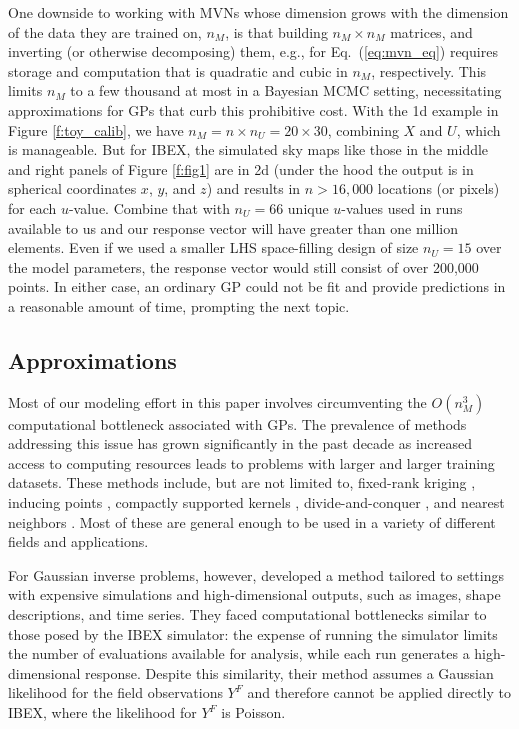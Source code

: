 \documentclass[11pt]{article}
\begin{document}
One downside to working with MVNs whose dimension grows with the dimension of
the data they are trained on, $n_M$, is that building $n_M \times n_M$
matrices, and inverting (or otherwise decomposing) them, e.g., for
Eq.~(\ref{eq:mvn_eq}) requires storage and computation that is quadratic and
cubic in $n_M$, respectively.  This limits $n_M$ to a few thousand at most in
a Bayesian MCMC setting, necessitating approximations for GPs that curb this
prohibitive cost. With the 1d example in Figure \ref{f:toy_calib}, we have
{\color{red}$n_M=n \times n_U = 20 \times 30$}, combining $X$ and $U$, which
is manageable. But for IBEX, the simulated sky maps like those in the middle
and right panels of Figure \ref{f:fig1} are in 2d (under the hood the output
is in spherical coordinates $x$, $y$, and $z$) and results in $n >16{,}000$
locations (or pixels) for each $u$-value. Combine that with
{\color{red}$n_U=66$} unique $u$-values used in runs available to us and our
response vector will have greater than one million elements. Even if we used a
smaller LHS space-filling design of size {\color{red}$n_U=15$} over the model
parameters, the response vector would still consist of over 200,000 points. In
either case, an ordinary GP could not be fit and provide predictions in a
reasonable amount of time, prompting the next topic.

\subsection{Approximations}
\label{sec:gp_approx}

Most of our modeling effort in this paper involves circumventing the
$O(n_M^3)$ computational bottleneck associated with GPs. The prevalence of
methods addressing this issue has grown significantly in the past decade as
increased access to computing resources leads to problems with larger and
larger training datasets. These methods include, but are not limited to,
fixed-rank kriging \citep{cressie2008fixed}, inducing points
\citep{banerjee2008gaussian}, compactly supported kernels
\citep{kaufman2011efficient}, divide-and-conquer \citep{gramacy2015local}, and
nearest neighbors \citep{datta2016hierarchical, wu2022variational}. Most of
these are general enough to be used in a variety of different fields and
applications.

For Gaussian inverse problems, however, \citet{higdoncalib2008} developed a
method tailored to settings with expensive simulations and high-dimensional
outputs, such as images, shape descriptions, and time series. {\color{red}They faced
computational bottlenecks similar to those posed by the IBEX simulator: the
expense of running the simulator limits the number of evaluations available
for analysis, while each run generates a high-dimensional response. Despite
this similarity, their method assumes a Gaussian likelihood for the field
observations $Y^F$ and therefore cannot be applied directly to IBEX, where the
likelihood for $Y^F$ is Poisson.}
\end{document}
